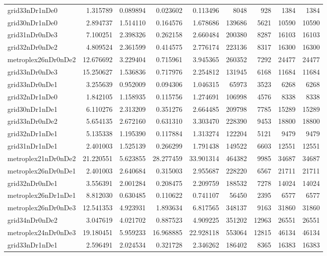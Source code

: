 \begin{longtable}{|l|r|r|r|r|r|r|r|r|}
grid33nDr1nDe0 & 1.315789 & 0.089894 & 0.023602 & 0.113496 & 8048 & 928 & 1384 & 1384 \\
grid30nDr1nDe0 & 2.894737 & 1.514110 & 0.164576 & 1.678686 & 139686 & 5621 & 10590 & 10590 \\
grid31nDr0nDe3 & 7.100251 & 2.398326 & 0.262158 & 2.660484 & 200380 & 8287 & 16103 & 16103 \\
grid32nDr0nDe2 & 4.809524 & 2.361599 & 0.414575 & 2.776174 & 223136 & 8317 & 16300 & 16300 \\
metroplex26nDr0nDe2 & 12.676692 & 3.229404 & 0.715961 & 3.945365 & 260352 & 7292 & 24477 & 24477 \\
grid33nDr0nDe3 & 15.250627 & 1.536836 & 0.717976 & 2.254812 & 131945 & 6168 & 11684 & 11684 \\
grid33nDr0nDe1 & 3.255639 & 0.952009 & 0.094306 & 1.046315 & 65973 & 3523 & 6268 & 6268 \\
grid32nDr1nDe0 & 1.842105 & 1.158935 & 0.115756 & 1.274691 & 106998 & 4576 & 8338 & 8338 \\
grid30nDr1nDe1 & 6.110276 & 2.313209 & 0.351276 & 2.664485 & 209798 & 7785 & 15289 & 15289 \\
grid33nDr0nDe2 & 5.654135 & 2.672160 & 0.631310 & 3.303470 & 228390 & 9453 & 18800 & 18800 \\
grid32nDr1nDe1 & 5.135338 & 1.195390 & 0.117884 & 1.313274 & 122204 & 5121 & 9479 & 9479 \\
grid31nDr1nDe1 & 2.401003 & 1.525139 & 0.266299 & 1.791438 & 149522 & 6603 & 12551 & 12551 \\
metroplex21nDr0nDe2 & 21.220551 & 5.623855 & 28.277459 & 33.901314 & 464382 & 9985 & 34687 & 34687 \\
metroplex26nDr0nDe1 & 2.401003 & 2.640684 & 0.315003 & 2.955687 & 228220 & 6567 & 21711 & 21711 \\
grid32nDr0nDe1 & 3.556391 & 2.001284 & 0.208475 & 2.209759 & 188532 & 7278 & 14024 & 14024 \\
metroplex26nDr1nDe1 & 8.812030 & 0.630485 & 0.110622 & 0.741107 & 56450 & 2395 & 6577 & 6577 \\
metroplex26nDr0nDe3 & 12.541353 & 4.923931 & 1.893634 & 6.817565 & 348137 & 9163 & 31860 & 31860 \\
grid34nDr0nDe2 & 3.047619 & 4.021702 & 0.887523 & 4.909225 & 351202 & 12963 & 26551 & 26551 \\
metroplex24nDr0nDe3 & 19.180451 & 5.959233 & 16.968885 & 22.928118 & 553064 & 12815 & 46134 & 46134 \\
grid33nDr1nDe1 & 2.596491 & 2.024534 & 0.321728 & 2.346262 & 186402 & 8365 & 16383 & 16383 \\

\end{longtable}
